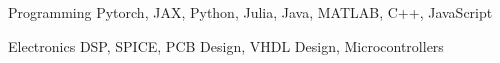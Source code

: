 

\begin{cvskills}

  \cvskill
    {Programming} %
    {Pytorch, JAX, Python, Julia, Java, MATLAB, C++, JavaScript} %

  \cvskill
    {Electronics} %
    {DSP, SPICE, PCB Design, VHDL Design, Microcontrollers} %

\end{cvskills}
